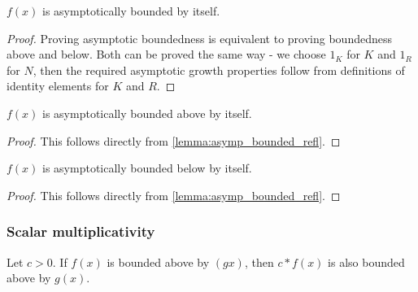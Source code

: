 \begin{lemma}
    \label{lemma:asymp_bounded_refl}
    \leanok
    $f(x)$ is asymptotically bounded by itself. 

\end{lemma}

\begin{proof}
    \leanok
    Proving asymptotic boundedness is equivalent to proving boundedness above and below.
    Both can be proved the same way - we choose $1_K$ for $K$ and $1_R$ for $N$, then the
    required asymptotic growth properties follow from definitions of identity elements for 
    $K$ and $R$.
\end{proof}

\begin{lemma}
    \label{lemma:asymp_bounded_above_refl}
    \leanok
    $f(x)$ is asymptotically bounded above by itself.

\end{lemma}

\begin{proof}
    \leanok
    This follows directly from \ref{lemma:asymp_bounded_refl}.
\end{proof}

\begin{lemma}
    \label{lemma:asymp_bounded_below_refl}
    \leanok
    $f(x)$ is asymptotically bounded below by itself.

\end{lemma}

\begin{proof}
    \leanok
    This follows directly from \ref{lemma:asymp_bounded_refl}.
\end{proof}


\subsubsection{Scalar multiplicativity}


\begin{lemma}
    \label{lemma:asymp_bounded_above_pos_smul}
    \leanok
    Let $c > 0$. If $f(x)$ is bounded above by $(gx)$, then $c*f(x)$ is also bounded
    above by $g(x)$.
\end{lemma}

